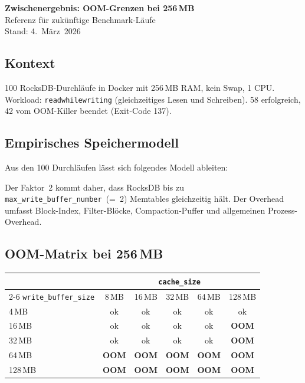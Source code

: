 \documentclass[11pt,a4paper]{scrartcl}
\begin{document}
\begin{center}
  {\Large\bfseries Zwischenergebnis: OOM-Grenzen bei 256\,MB}\\[4pt]
  {\normalsize Referenz f\"ur zuk\"unftige Benchmark-L\"aufe}\\[2pt]
  {\small Stand: 4.~M\"arz~2026}
\end{center}

\bigskip

\subsection*{Kontext}

100 RocksDB-Durchl\"aufe in Docker mit 256\,MB RAM, kein Swap, 1 CPU.
Workload: \texttt{readwhilewriting} (gleichzeitiges Lesen und Schreiben).
58 erfolgreich, 42 vom OOM-Killer beendet (Exit-Code 137).

\subsection*{Empirisches Speichermodell}

Aus den 100 Durchl\"aufen l\"asst sich folgendes Modell ableiten:

\begin{center}
\end{center}

Der Faktor~2 kommt daher, dass RocksDB bis zu \texttt{max\_write\_buffer\_number}~(=~2)
Memtables gleichzeitig h\"alt. Der Overhead umfasst Block-Index, Filter-Bl\"ocke,
Compaction-Puffer und allgemeinen Prozess-Overhead.

\subsection*{OOM-Matrix bei 256\,MB}

\begin{center}
\begin{tabular}{l *{5}{c}}
\toprule
 & \multicolumn{5}{c}{\texttt{cache\_size}} \\
\cmidrule(lr){2-6}
\texttt{write\_buffer\_size} & 8\,MB & 16\,MB & 32\,MB & 64\,MB & 128\,MB \\
\midrule
4\,MB   & ok & ok & ok & ok & ok \\
16\,MB  & ok & ok & ok & ok & \textbf{OOM} \\
32\,MB  & ok & ok & ok & ok & \textbf{OOM} \\
64\,MB  & \textbf{OOM} & \textbf{OOM} & \textbf{OOM} & \textbf{OOM} & \textbf{OOM} \\
128\,MB & \textbf{OOM} & \textbf{OOM} & \textbf{OOM} & \textbf{OOM} & \textbf{OOM} \\
\bottomrule
\end{tabular}
\end{center}
\end{document}
